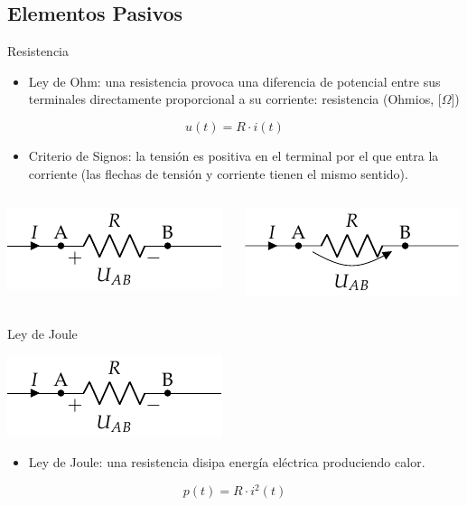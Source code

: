 \documentclass[aspectratio=169, usenames,svgnames,dvipsnames]{beamer}
\begin{document}
\subsection{Elementos Pasivos}
\label{sec:orgaee24f0}
\begin{frame}[label={sec:org79787e8}]{Resistencia}
\begin{itemize}
\item \alert{Ley de Ohm}: una resistencia provoca una \alert{diferencia de potencial} entre sus terminales \alert{directamente proporcional} a su corriente: \alert{resistencia} (Ohmios, [\(\Omega\)])
\end{itemize}
\[
u(t) = R \cdot i(t)
\]
\begin{itemize}
\item \alert{Criterio de Signos}: la tensión es positiva en el terminal por el que entra la corriente (las flechas de tensión y corriente tienen el mismo sentido).
\end{itemize}
\begin{columns}
\begin{column}{0.5\columnwidth}
\begin{center}
\includegraphics[height=0.2\textheight]{../figs/Resistencia.pdf}
\end{center}
\end{column}
\begin{column}{0.5\columnwidth}
\begin{center}
\includegraphics[height=0.2\textheight]{../figs/Resistencia_Flecha.pdf}
\end{center}
\end{column}
\end{columns}
\end{frame}
\begin{frame}[label={sec:orgc6aa37e}]{Ley de Joule}
\begin{center}
\includegraphics[height=0.2\textheight]{../figs/Resistencia.pdf}
\end{center}

\begin{itemize}
\item \alert{Ley de Joule}: una resistencia disipa energía eléctrica produciendo \alert{calor}.
\end{itemize}
\[
p(t)=R\cdot i^{2}(t)
\]
\end{frame}
\end{document}
